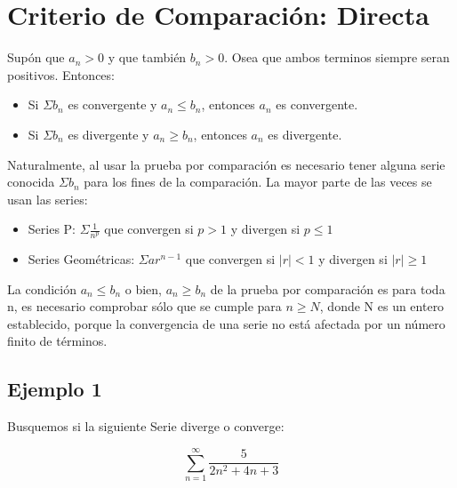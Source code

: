 \documentclass[12pt]{report}                                %
\begin{document}
    \clearpage
    \section{Criterio de Comparación: Directa}

        Supón que $a _n > 0$ y que también $b_n > 0$. Osea que ambos terminos siempre seran positivos.
        Entonces:

        \begin{itemize}
            \item Si $\Sigma b_n$ es convergente y $a_n \leq b_n$, entonces $a_n$ es convergente. 
            \item Si $\Sigma b_n$ es divergente y $a_n \geq b_n$, entonces $a_n$ es divergente. 
        \end{itemize}

        Naturalmente, al usar la prueba por comparación es necesario tener alguna serie conocida $\Sigma b_n$
        para los fines de la comparación. La mayor parte de las veces se usan las series:

        \begin{itemize}
            \item Series P: $\Sigma \frac{1}{n^p}$ que convergen si $p>1$ y divergen si $p\leq 1$
            \item Series Geométricas: $\Sigma ar^{n-1}$ que convergen si $|r|<1$ y divergen si $|r|\geq 1$
        \end{itemize}

        La condición $a_n \leq b_n$ o bien, $a_n \geq b_n$ de la prueba por comparación es para toda n, es
        necesario comprobar sólo que se cumple para $n \geq N$, donde N es un entero establecido, porque
        la convergencia de una serie no está afectada por un número finito de términos.

        \subsection{Ejemplo 1}
        Busquemos si la siguiente Serie diverge o converge:

        \begin{equation*}
            \sum_{n=1}^{\infty} \frac{5}{2n^2 +4n +3}
        \end{equation*}
\end{document}
